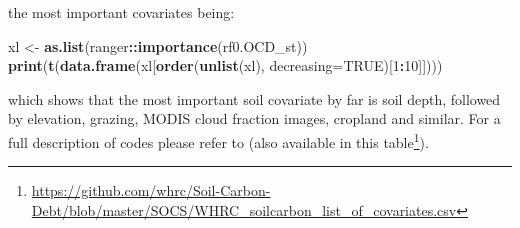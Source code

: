 \documentclass[graybox,natbib,nospthms,UStrade]{svmono}
\newenvironment{Shaded}{\begin{snugshade}}{\end{snugshade}}
\newcommand{\DataTypeTok}[1]{\textcolor[rgb]{0.27,0.27,0.27}{#1}}
\newcommand{\DecValTok}[1]{\textcolor[rgb]{0.06,0.06,0.06}{#1}}
\newcommand{\KeywordTok}[1]{\textcolor[rgb]{0.27,0.27,0.27}{\textbf{#1}}}
\newcommand{\NormalTok}[1]{#1}
\newcommand{\OperatorTok}[1]{\textcolor[rgb]{0.43,0.43,0.43}{\textbf{#1}}}
\newcommand{\OtherTok}[1]{\textcolor[rgb]{0.37,0.37,0.37}{#1}}
\newcommand{\StringTok}[1]{\textcolor[rgb]{0.5,0.5,0.5}{#1}}
\renewcommand{\href}[2]{#2 (\url{#1})}
\renewcommand{\href}[2]{#2\footnote{\url{#1}}}
\begin{document}
\begin{Shaded}
\end{Shaded}

the most important covariates being:

\begin{Shaded}
\begin{Highlighting}[]
\NormalTok{xl <-}\StringTok{ }\KeywordTok{as.list}\NormalTok{(ranger}\OperatorTok{::}\KeywordTok{importance}\NormalTok{(rf0.OCD_st))}
\KeywordTok{print}\NormalTok{(}\KeywordTok{t}\NormalTok{(}\KeywordTok{data.frame}\NormalTok{(xl[}\KeywordTok{order}\NormalTok{(}\KeywordTok{unlist}\NormalTok{(xl), }\DataTypeTok{decreasing=}\OtherTok{TRUE}\NormalTok{)[}\DecValTok{1}\OperatorTok{:}\DecValTok{10}\NormalTok{]])))}
\end{Highlighting}
\end{Shaded}

which shows that the most important soil covariate by far is soil depth, followed by elevation, grazing, MODIS cloud fraction images, cropland and similar. For a full description of codes please refer to \citet{sanderman2018soil} (also available in \href{https://github.com/whrc/Soil-Carbon-Debt/blob/master/SOCS/WHRC_soilcarbon_list_of_covariates.csv}{this table}).
\end{document}
